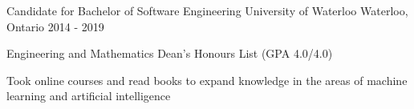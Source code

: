 \begin{cventries}
  \cventry
    {Candidate for Bachelor of Software Engineering}
    {University of Waterloo}
    {Waterloo, Ontario}
    {2014 - 2019}
    {
      \begin{cvitems}
      \item Engineering and Mathematics Dean’s Honours List (GPA 4.0/4.0)
      \item Took online courses and read books to expand knowledge in the areas of machine learning and artificial intelligence
      \end{cvitems}
    }
\end{cventries}
